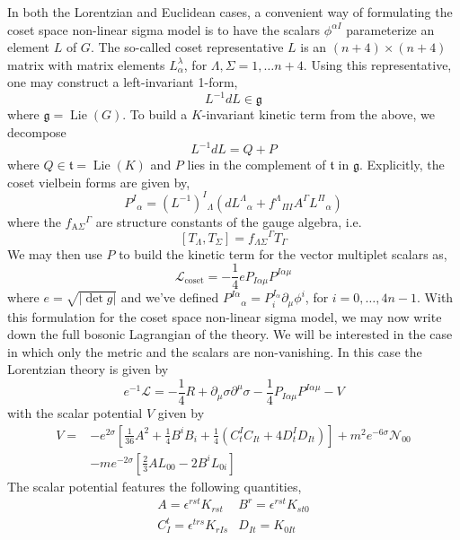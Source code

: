 \documentclass{article}
\begin{document}
In both the Lorentzian and Euclidean cases, a convenient way of formulating the coset space non-linear sigma model is to have the scalars \(\phi^{\alpha I}\) parameterize an element \(L\) of \(G\). The so-called coset representative \(L\) is an \((n+4) \times(n+4)\) matrix with matrix elements \(L_{\alpha}^{\lambda}\), for \(\Lambda, \Sigma=1, \ldots n+4\). Using this representative, one may construct a left-invariant 1-form,
\[
L^{-1} d L \in \mathfrak{g}
\]
where \(\mathfrak{g}=\operatorname{Lie}(G)\). To build a \(K\)-invariant kinetic term from the above, we decompose
\[
L^{-1} d L=Q+P
\]
where \(Q \in \mathfrak{t}=\operatorname{Lie}(K)\) and \(P\) lies in the complement of \(\mathfrak{t}\) in \(\mathfrak{g}\). Explicitly, the coset vielbein forms are given by,
\[
P^{I}{ }_{\alpha}=\left(L^{-1}\right)^{I}{ }_{\Lambda}\left(d L^{\Lambda}{ }_{\alpha}+f^{\Lambda}{ }_{\Pi I} A^{\Gamma} L^{\Pi}{ }_{\alpha}\right)
\]
where the \(f_{\mathrm{A} \Sigma}{ }^{\Gamma}\) are structure constants of the gauge algebra, i.e.
\[
\left[T_{\Lambda}, T_{\Sigma}\right]=f_{\Lambda \Sigma}{ }^{\Gamma} T_{\Gamma}
\]
We may then use \(P\) to build the kinetic term for the vector multiplet scalars as,
\[
\mathcal{L}_{\mathrm{coset}}=-\frac{1}{4}eP_{I \alpha \mu}P^{I \alpha \mu}
\]
where \(e=\sqrt{|\det g|}\) and we've defined \(P^{I \alpha}{ }_{\alpha}=P^{I_{\alpha}}_{i} \partial_{\mu} \phi^{i}\), for \(i=0, \ldots, 4 n-1\). With this formulation for the coset space non-linear sigma model, we may now write down the full bosonic Lagrangian of the theory. We will be interested in the case in which only the metric and the scalars are non-vanishing. In this case the Lorentzian theory is given by
\[
e^{-1} \mathcal{L}=-\frac{1}{4} R+\partial_{\mu} \sigma \partial^{\mu} \sigma-\frac{1}{4} P_{I \alpha \mu} P^{I \alpha \mu}-V
\]
with the scalar potential \(V\) given by
\[
\begin{aligned}
V= & -e^{2 \sigma}\left[\frac{1}{36} A^{2}+\frac{1}{4} B^{i} B_{i}+\frac{1}{4}\left(C_{t}^{I} C_{I t}+4 D_{t}^{I} D_{I t}\right)\right]+m^{2} e^{-6 \sigma} \mathcal{N}_{00} \\
& -m e^{-2 \sigma}\left[\frac{2}{3} A L_{00}-2 B^{i} L_{0 i}\right]
\end{aligned}
\]
The scalar potential features the following quantities,
\[
\begin{array}{ll}
A=\epsilon^{r s t} K_{r s t} & B^{r}=\epsilon^{r s t} K_{s t 0} \\
C_{I}^{t}=\epsilon^{t r s} K_{r I s} & D_{I t}=K_{0 I t}
\end{array}
\]
\end{document}

